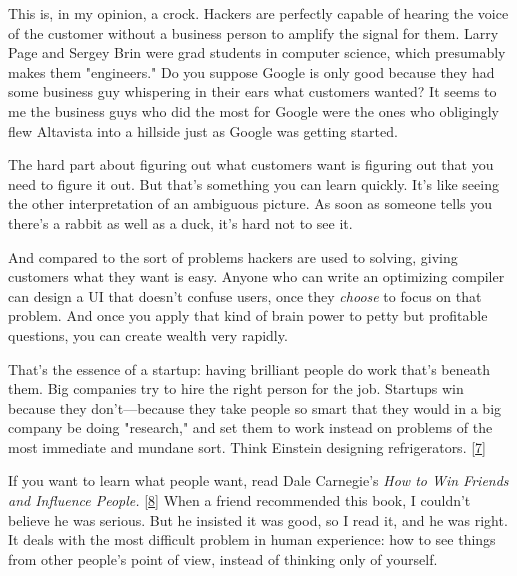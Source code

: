                   This is, in my opinion, a crock. Hackers are perfectly capable
                  of hearing the voice of the customer without a business person
                  to amplify the signal for them. Larry Page and Sergey Brin
                  were grad students in computer science, which presumably makes
                  them "engineers." Do you suppose Google is only good because
                  they had some business guy whispering in their ears what
                  customers wanted? It seems to me the business guys who did the
                  most for Google were the ones who obligingly flew Altavista
                  into a hillside just as Google was getting started.

The
                  hard part about figuring out what customers want is figuring
                  out that you need to figure it out. But that's something you
                  can learn quickly. It's like seeing the other interpretation
                  of an ambiguous picture. As soon as someone tells you there's
                  a rabbit as well as a duck, it's hard not to see it.

And
                  compared to the sort of problems hackers are used to solving,
                  giving customers what they want is easy. Anyone who can write
                  an optimizing compiler can design a UI that doesn't confuse
                  users, once they \emph{choose} to focus on that problem. And
                  once you apply that kind of brain power to petty but
                  profitable questions, you can create wealth very rapidly.

That's
                  the essence of a startup: having brilliant people do work
                  that's beneath them. Big companies try to hire the right
                  person for the job. Startups win because they
                  don't---because they take people so smart that they would
                  in a big company be doing "research," and set them to work
                  instead on problems of the most immediate and mundane sort.
                  Think Einstein designing refrigerators.
                  [\href{\#f7n}{7}]

If you want to learn what people want, read Dale
                  Carnegie's \emph{How to Win Friends and Influence People.}
                  [\href{\#f8n}{8}]
                  When a friend recommended this book, I couldn't believe he was
                  serious. But he insisted it was good, so I read it, and he was
                  right. It deals with the most difficult problem in human
                  experience: how to see things from other people's point of
                  view, instead of thinking only of yourself.

